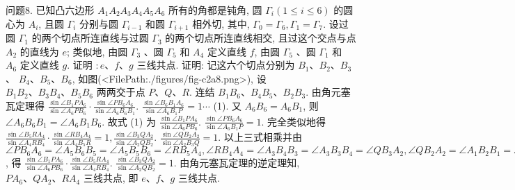 问题8. 已知凸六边形 $A_1 A_2 A_3 A_4 A_5 A_6$ 所有的角都是钝角, 圆 $\Gamma_i(1 \leqslant i \leqslant 6)$ 的圆心为 $A_i$, 且圆 $\Gamma_i$ 分别与圆 $\Gamma_{i-1}$ 和圆 $\Gamma_{i+1}$ 相外切, 其中, $\Gamma_0=\Gamma_6, \Gamma_1= \Gamma_7$. 设过圆 $\Gamma_1$ 的两个切点所连直线与过圆 $\Gamma_3$ 的两个切点所连直线相交, 且过这个交点与点 $A_2$ 的直线为 $e$; 类似地, 由圆 $\Gamma_3$ 、圆 $\Gamma_5$ 和 $A_4$ 定义直线 $f$, 由圆 $\Gamma_5$ 、圆 $\Gamma_1$ 和 $A_6$ 定义直线 $g$. 证明 $: e 、 f 、 g$ 三线共点.
证明: 记这六个切点分别为 $B_1 、 B_2 、 B_3$ 、 $B_4 、 B_5 、 B_6$, 如图(<FilePath:./figures/fig-c2a8.png>), 设 $B_1 B_2 、 B_3 B_4 、 B_5 B_6$ 两两交于点 $P 、 Q 、 R$. 连结 $B_1 B_6 、 B_4 B_5 、 B_2 B_3$. 由角元塞瓦定理得 $\frac{\sin \angle B_1 P A_6}{\sin \angle A_6 P B_6} \cdot \frac{\sin \angle P B_6 A_6}{\sin \angle A_6 B_6 B_1}$. $\frac{\sin \angle B_6 B_1 A_6}{\sin \angle A_6 B_1 P}=1 \cdots$ (1). 又 $A_6 B_6=A_6 B_1$, 则 $\angle A_6 B_6 B_1=\angle A_6 B_1 B_6$. 故式 (1) 为 $\frac{\sin \angle B_1 P A_6}{\sin \angle A_6 P B_6}$.
$\frac{\sin \angle P B_6 A_6}{\sin \angle A_6 B_1 P}=1$. 完全类似地得 $\frac{\sin \angle B_5 R A_4}{\sin \angle A_4 R B_4} \cdot \frac{\sin \angle R B_4 A_4}{\sin \angle A_4 B_5 R}=1, \frac{\sin \angle B_3 Q A_2}{\sin \angle A_2 Q B_2}$. $\frac{\sin \angle Q B_2 A_2}{\sin \angle A_2 B_3 Q}=1$. 以上三式相乘并由 $\angle P B_6 A_6=\angle A_5 B_6 B_5=\angle A_5 B_5 B_6= \angle R B_5 A_4, \angle R B_4 A_4=\angle A_3 B_4 B_3=\angle A_3 B_3 B_4=\angle Q B_3 A_2, \angle Q B_2 A_2= \angle A_1 B_2 B_1=\angle A_1 B_1 B_2=\angle P B_1 A_6$, 得 $\frac{\sin \angle B_1 P A_6}{\sin \angle A_6 P B_6} \cdot \frac{\sin \angle B_5 R A_4}{\sin \angle A_4 R B_4}$. $\frac{\sin \angle B_3 Q A_2}{\sin \angle A_2 Q B_2}=1$. 由角元塞瓦定理的逆定理知, $P A_6 、 Q A_2 、 R A_4$ 三线共点, 即 $e 、 f 、 g$ 三线共点.




